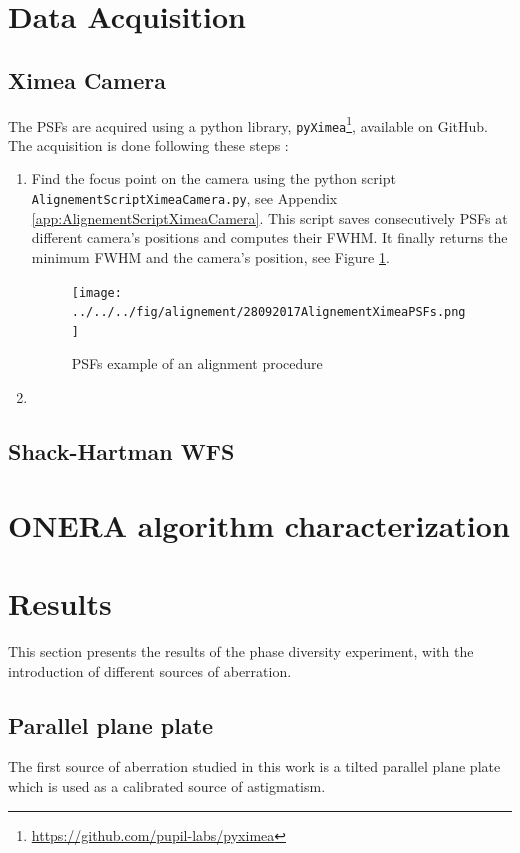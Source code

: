 \section{Data Acquisition}

\subsection{Ximea Camera}
The PSFs are acquired using a python library, \verb|pyXimea|\footnote{\url{https://github.com/pupil-labs/pyximea}}, available on GitHub. The acquisition is done following these steps : 
\begin{enumerate}
\item Find the focus point on the camera using the python script \verb|AlignementScriptXimeaCamera.py|, see Appendix \ref{app:AlignementScriptXimeaCamera}. This script saves consecutively PSFs at different camera's positions and computes their FWHM. It finally returns the minimum FWHM and the camera's position, see Figure \ref{fig:28092017AlignementXimeaPSFs}.
\begin{center}
\begin{figure}
\texttt{[image: ../../../fig/alignement/28092017AlignementXimeaPSFs.png]}
\caption{PSFs example of an alignment procedure}
\label{fig:28092017AlignementXimeaPSFs}
\end{figure}
\end{center}

\item 


\end{enumerate}


\subsection{Shack-Hartman WFS}


\section{ONERA algorithm characterization}



\section{Results}

This section presents the results of the phase diversity experiment, with the introduction of different sources of aberration.

\subsection{Parallel plane plate}

The first source of aberration studied in this work is a tilted parallel plane plate which is used as a calibrated source of astigmatism.
